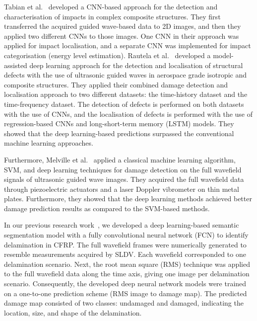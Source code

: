 \begin{sloppypar}
	Tabian et al.~\cite{Tabian2019} developed a CNN-based approach for the detection and characterisation of impacts in complex composite structures.
	They first transferred the acquired guided wave-based data to 2D images, and then they applied two different CNNs to those images.
	One CNN in their approach was applied for impact localisation, and a separate CNN was implemented for impact categorisation (energy level estimation).
	Rautela et al.~\cite{rautela2021ultrasonic} developed a model-assisted deep learning approach for the detection and localisation of structural defects with the use of ultrasonic guided waves in aerospace grade isotropic and composite structures. 
	They applied their combined damage detection and localisation approach to two different datasets: the time-history dataset and the time-frequency dataset. 
	The detection of defects is performed on both datasets with the use of CNNs, and the localisation of defects is performed with the use of regression-based CNNs and long-short-term memory (LSTM) models. 
	They showed that the deep learning-based predictions surpassed the conventional machine learning approaches.

	Furthermore, Melville et al.~\cite{Melville2018} applied a classical machine learning algorithm, SVM, and deep learning techniques for damage detection on the full wavefield signals of ultrasonic guided wave images.
	They acquired the full wavefield data through piezoelectric actuators and a laser Doppler vibrometer on thin metal plates.
	Furthermore, they showed that the deep learning methods achieved better damage prediction results as compared to the SVM-based methods.

	In our previous research work~\cite{Ijjeh2021}, we developed a deep learning-based semantic segmentation model with a fully convolutional neural network (FCN) to identify delamination in CFRP.
	The full wavefield frames were numerically generated to resemble measurements acquired by SLDV.
	Each wavefield corresponded to one delamination scenario.
	Next, the root mean square (RMS) technique was applied to the full wavefield data along the time axis, giving one image per delamination scenario.
	Consequently, the developed deep neural network models were trained on a one-to-one prediction scheme (RMS image to damage map).
	The predicted damage map consisted of two classes: undamaged and damaged, indicating the location, size, and shape of the delamination.


\end{sloppypar}
